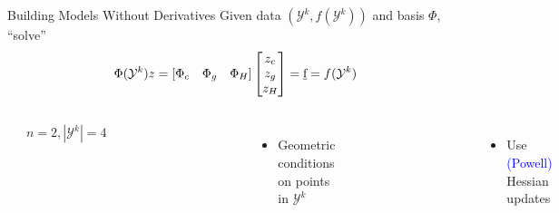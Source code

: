\documentclass[handout,aspectratio=54]{beamer}
\numberwithin{theorem}{section}
\begin{document}
\begin{frame}{Building Models Without Derivatives}
\small
Given data $(\mathcal{Y}^k,f(\mathcal{Y}^k))$ and basis $\Phi$, “solve”
\begin{equation*}
\Phi(\mathcal{Y}^k)z=[\Phi_c\quad\Phi_g\quad\Phi_H]
\begin{bmatrix}
z_c\\
z_g\\
z_H
\end{bmatrix}
=\underline{\textup{f}}=f(\mathcal{Y}^k)
\end{equation*}

\begin{columns}
\includegraphics[width=\textwidth]{fig/24.jpg}

\begin{center}
$n=2,|\mathcal{Y}^k|=4$
\end{center}

\colorbox[rgb]{0.5,0.6,0.7}{\textcolor{white}{Full quadratics, $|\mathcal{Y}^k|=\frac{(n+1)(n+2)}{2}$}}
\begin{itemize}\footnotesize
\item Geometric conditions on points in $\mathcal{Y}^k$
\end{itemize}

\colorbox[rgb]{0.5,0.6,0.7}{\textcolor{white}{Undetermined interpolation, }}
\colorbox[rgb]{0.5,0.6,0.7}{\textcolor{white}{$|\mathcal{Y}^k|<\frac{(n+1)(n+2)}{2}$}}
\begin{itemize}\footnotesize
\item Use \textcolor{blue}{(Powell)} Hessian updates


\end{itemize}
\end{columns}
\end{frame}
\end{document}
